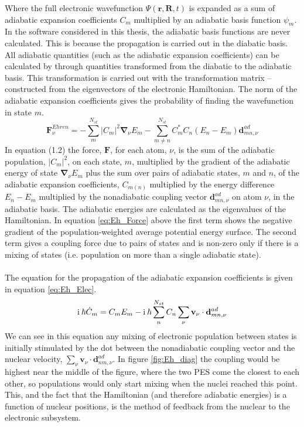 Where the full electronic wavefunction $\Psi(\mathbf{r}, \mathbf{R}, t)$ is expanded as a sum of adiabatic expansion coefficients $C_{m}$ multiplied by an adiabatic basis function $\psi_{m}$. In the software considered in this thesis, the adiabatic basis functions are never calculated. This is because the propagation is carried out in the diabatic basis. All adiabatic quantities (such as the adiabatic expansion coefficients) can be calculated by through quantities transformed from the diabatic to the adiabatic basis. This transformation is carried out with the transformation matrix --constructed from the eigenvectors of the electronic Hamiltonian. The norm of the adiabatic expansion coefficients gives the probability of finding the wavefunction in state $m$.
\begin{equation}
	\mathbf{F}_{\nu}^{Ehren} = -\sum_{m}^{N_{st}} |C_{m}|^2 \mathbf{\nabla}_{\nu} E_{m} - \sum_{m \neq n}^{N_{st}} C_{m}^{*} C_{n} (E_{n} - E_{m}) \mathbf{d}_{mn, \nu}^{ad}
  \label{eq:Eh_Force}
\end{equation}
In equation (1.2) the force, $\mathbf{F}$, for each atom, $\nu$, is the sum of the adiabatic population, $|C_{m}|^2$, on each state, $m$, multiplied by the gradient of the adiabatic energy of state $\mathbf{\nabla}_{\nu}E_{m}$ plus the sum over pairs of adiabatic states, $m$ and $n$, of the adiabatic expansion coefficients, $C_{m (n)}$ multiplied by the energy difference $E_{n} - E_{m}$ multiplied by the nonadiabatic coupling vector $\mathbf{d}_{mn, \nu}^{ad}$ on atom $\nu$, in the adiabatic basis. The adiabatic energies are calculated as the eigenvalues of the Hamiltonian. In equation\textcolor{blue}{ \eqref{eq:Eh_Force} } above the first term shows the negative gradient of the population-weighted average potential energy surface. The second term gives a coupling force due to pairs of states and is non-zero only if there is a mixing of states (i.e. population on more than a single adiabatic state).
\\\\
The equation for the propagation of the adiabatic expansion coefficients is given in equation \eqref{eq:Eh_Elec}.
\begin{equation}
	\mathrm{i} \: \hbar \dot{C}_{m} = C_{m}E_{m} -  \mathrm{i} \: \hbar  \sum_{n}^{N_{st}} C_{n} \sum_{\nu} \mathbf{v}_{\nu} \cdot \mathbf{d}^{ad}_{mn, \nu}
  \label{eq:Eh_Elec}
\end{equation}
We can see in this equation any mixing of electronic population between states is initially stimulated by the dot between the nonadiabatic coupling vector and the nuclear velocity, $\sum_{\nu} \mathbf{v}_{\nu} \cdot \mathbf{d}_{nm, \nu}^{ad}$. In figure \ref{fig:Eh_diag} the coupling would be highest near the middle of the figure, where the two PES come the closest to each other, so populations would only start mixing when the nuclei reached this point. This, and the fact that the Hamiltonian (and therefore adiabatic energies) is a function of nuclear positions, is the method of feedback from the nuclear to the electronic subsystem. 
